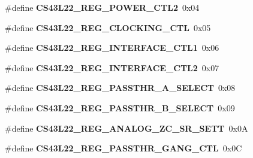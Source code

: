 \begin{DoxyCompactItemize}
\mbox{\label{group___c_s43_l22___exported___constants_ga00541a7fa353d2b601256cc944e01ce0}} 
\#define {\bfseries C\+S43\+L22\+\_\+\+R\+E\+G\+\_\+\+P\+O\+W\+E\+R\+\_\+\+C\+T\+L2}~0x04
\item 
\mbox{\label{group___c_s43_l22___exported___constants_ga03d16562e2bc92a2a7d759034b142e7c}} 
\#define {\bfseries C\+S43\+L22\+\_\+\+R\+E\+G\+\_\+\+C\+L\+O\+C\+K\+I\+N\+G\+\_\+\+C\+TL}~0x05
\item 
\mbox{\label{group___c_s43_l22___exported___constants_ga4dd9941372a0989f4ac9b1b63c9a80d3}} 
\#define {\bfseries C\+S43\+L22\+\_\+\+R\+E\+G\+\_\+\+I\+N\+T\+E\+R\+F\+A\+C\+E\+\_\+\+C\+T\+L1}~0x06
\item 
\mbox{\label{group___c_s43_l22___exported___constants_gaab5f7bbb7cb3e20877fd3d8e83aa9c2f}} 
\#define {\bfseries C\+S43\+L22\+\_\+\+R\+E\+G\+\_\+\+I\+N\+T\+E\+R\+F\+A\+C\+E\+\_\+\+C\+T\+L2}~0x07
\item 
\mbox{\label{group___c_s43_l22___exported___constants_gab9ec74b96e3e0f3e2de1b60a28b6a5c7}} 
\#define {\bfseries C\+S43\+L22\+\_\+\+R\+E\+G\+\_\+\+P\+A\+S\+S\+T\+H\+R\+\_\+\+A\+\_\+\+S\+E\+L\+E\+CT}~0x08
\item 
\mbox{\label{group___c_s43_l22___exported___constants_ga6939efad53f0095f515650319eaa9466}} 
\#define {\bfseries C\+S43\+L22\+\_\+\+R\+E\+G\+\_\+\+P\+A\+S\+S\+T\+H\+R\+\_\+\+B\+\_\+\+S\+E\+L\+E\+CT}~0x09
\item 
\mbox{\label{group___c_s43_l22___exported___constants_ga18eec2db4817b97e52e19c771a2ddc40}} 
\#define {\bfseries C\+S43\+L22\+\_\+\+R\+E\+G\+\_\+\+A\+N\+A\+L\+O\+G\+\_\+\+Z\+C\+\_\+\+S\+R\+\_\+\+S\+E\+TT}~0x0A
\item 
\mbox{\label{group___c_s43_l22___exported___constants_ga4eab2f3d03464962537865e65a920f59}} 
\#define {\bfseries C\+S43\+L22\+\_\+\+R\+E\+G\+\_\+\+P\+A\+S\+S\+T\+H\+R\+\_\+\+G\+A\+N\+G\+\_\+\+C\+TL}~0x0C

\end{DoxyCompactItemize}
